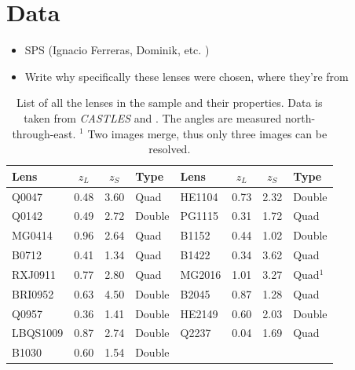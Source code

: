 \documentclass[useAMS,usenatbib]{mn2e}
\begin{document}
\section{Data}\label{sec:data}
\begin{itemize}
\item SPS (Ignacio Ferreras, Dominik, etc. \citep{2011ApJ...740...97L})
\item Write why specifically these lenses were chosen, where they're from
\end{itemize}



\begin{table}
 \begin{center}
  \begin{tabular}{l c c l || l c c l}
   Lens & $z_{L}$ & $z_{S}$ & Type & Lens & $z_{L}$ & $z_{S}$ & Type\\ \hline \hline
   Q0047 & 0.48 & 3.60 & Quad & HE1104 & 0.73 & 2.32 & Double\\
   Q0142 & 0.49 & 2.72 & Double & PG1115 & 0.31 & 1.72 & Quad\\
   MG0414 & 0.96 & 2.64 & Quad & B1152 & 0.44 & 1.02 & Double\\
   B0712 & 0.41 & 1.34 & Quad & B1422 & 0.34 & 3.62 & Quad\\
   RXJ0911 & 0.77 & 2.80 & Quad & MG2016 & 1.01 & 3.27 & Quad$^{1}$\\
   BRI0952 & 0.63 & 4.50 & Double & B2045 & 0.87 & 1.28 & Quad\\
   Q0957 & 0.36 & 1.41 & Double & HE2149 & 0.60 & 2.03 & Double\\
   LBQS1009 & 0.87 & 2.74 & Double & Q2237 & 0.04 & 1.69 & Quad\\
   B1030 & 0.60 & 1.54 & Double & & & & \\
  \end{tabular}
  \caption{List of all the lenses in the sample and their properties. Data is taken from \textit{CASTLES} and \cite{leier11phd}. The angles are measured north-through-east. \newline $^{1}$ Two images merge, thus only three images can be resolved.}
  \label{tab:overview}
 \end{center}
\end{table}
\end{document}
